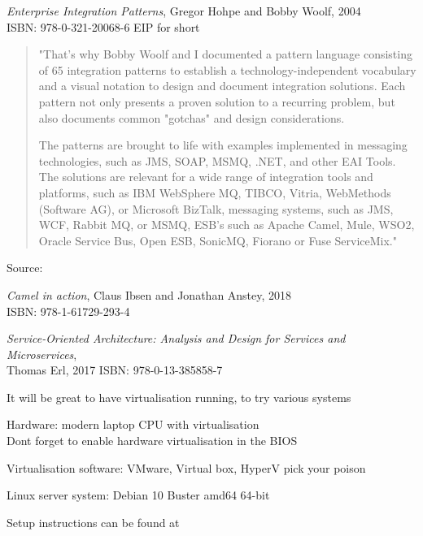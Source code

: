 \documentclass[Screen16to9,17pt]{foils}
\begin{document}


\emph{Enterprise Integration Patterns}, Gregor Hohpe and Bobby Woolf, 2004\\
ISBN: 978-0-321-20068-6 EIP for short



\begin{quote}
"That's why Bobby Woolf and I documented a pattern language consisting of 65 integration patterns to establish a technology-independent vocabulary and a visual notation to design and document integration solutions. Each pattern not only presents a proven solution to a recurring problem, but also documents common "gotchas" and design considerations.

The patterns are brought to life with examples implemented in messaging technologies, such as JMS, SOAP, MSMQ, .NET, and other EAI Tools. The solutions are relevant for a wide range of integration tools and platforms, such as IBM WebSphere MQ, TIBCO, Vitria, WebMethods (Software AG), or Microsoft BizTalk, messaging systems, such as JMS, WCF, Rabbit MQ, or MSMQ, ESB's such as Apache Camel, Mule, WSO2, Oracle Service Bus, Open ESB, SonicMQ, Fiorano or Fuse ServiceMix."
\end{quote}

Source:\\



\emph{Camel in action}, Claus Ibsen and Jonathan Anstey, 2018\\
ISBN: 978-1-61729-293-4



\emph{Service‑Oriented Architecture: Analysis and Design for Services and Microservices},\\ Thomas Erl, 2017
ISBN: 978-0-13-385858-7




\begin{list2}
\item It will be great to have virtualisation running, to try various systems
\item Hardware: modern laptop CPU with virtualisation\\
Dont forget to enable hardware virtualisation in the BIOS
\item Virtualisation software: VMware, Virtual box, HyperV pick your poison
\item Linux server system: Debian 10 Buster amd64 64-bit
\item Setup instructions can be found at 
\end{list2}
\end{document}
